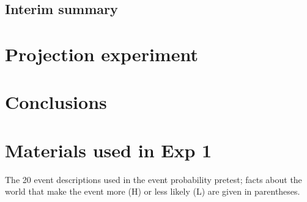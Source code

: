 \documentclass[11pt,fleqn]{article}
\newcommand{\6}{\mbox{$[\hspace*{-.6mm}[$}}
\newcommand{\9}{\mbox{$]\hspace*{-.6mm}]$}}
\begin{document}
\subsection{Interim summary}

\section{Projection experiment}

\section{Conclusions}\label{s6}


\appendix

\setcounter{table}{0}
\renewcommand{\thetable}{A\arabic{table}}

\setcounter{figure}{0}
\renewcommand{\thefigure}{A\arabic{figure}}

\section{Materials used in Exp 1}\label{a-exp1}

The 20 event descriptions used in the event probability pretest; facts about the world that make the event more (H) or less likely (L) are given in parentheses. 
\end{document}
